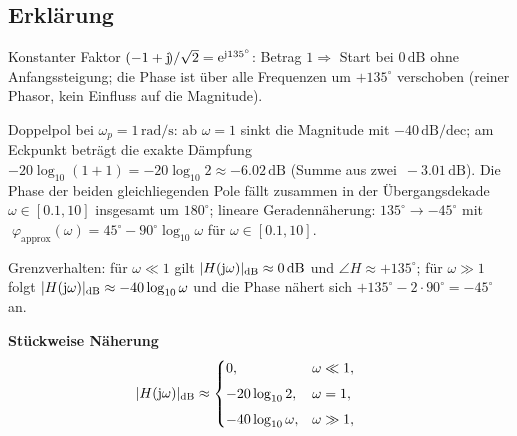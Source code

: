 \subsection{Erklärung}
\vspace{5mm}
\begin{description}[leftmargin=1.2em,labelsep=.6em,font=\bfseries]
\item[Schritt 1] Konstanter Faktor $(-1+\operatorname{j}\!)/\sqrt{2}=\mathrm{e}^{\operatorname{j}\!135^\circ}$: Betrag $1\Rightarrow$ Start bei $0\,\mathrm{dB}$ ohne Anfangssteigung; die Phase ist über alle Frequenzen um $+135^\circ$ verschoben (reiner Phasor, kein Einfluss auf die Magnitude).
\item[Schritt 2] Doppelpol bei $\omega_p=1\,\mathrm{rad/s}$: ab $\omega=1$ sinkt die Magnitude mit $-40\,\mathrm{dB/dec}$; am Eckpunkt beträgt die exakte Dämpfung $-20\log_{10}(1+1)= -20\log_{10}2\approx-6.02\,\mathrm{dB}$ (Summe aus zwei $\,-3.01\,\mathrm{dB}$). Die Phase der beiden gleichliegenden Pole fällt zusammen in der Übergangsdekade $\omega\in[0.1,10]$ insgesamt um $180^\circ$; lineare Geradennäherung: $135^\circ\to-45^\circ$ mit $\;\varphi_{\text{approx}}(\omega)=45^\circ-90^\circ\log_{10}\omega$ für $\omega\in[0.1,10]$.
\item[Schritt 3] Grenzverhalten: für $\omega\ll1$ gilt $|H(\operatorname{j}\!\omega)|_{\mathrm{dB}}\approx0\,\mathrm{dB}$ und $\angle H\approx+135^\circ$; für $\omega\gg1$ folgt $|H(\operatorname{j}\!\omega)|_{\mathrm{dB}}\approx-40\log_{10}\omega$ und die Phase nähert sich $+135^\circ-2\cdot90^\circ=-45^\circ$ an.
\end{description}

\vspace{0.5cm}
\medskip
\noindent\textbf{Stückweise Näherung}
\[
|H(\operatorname{j}\!\omega)|_{\mathrm{dB}}\approx
\begin{cases}
0,& \omega\ll1,\\[4pt]
-20\log_{10}2,& \omega=1,\\[4pt]
-40\log_{10}\omega,& \omega\gg1,
\end{cases}
\qquad
\]
\newpage